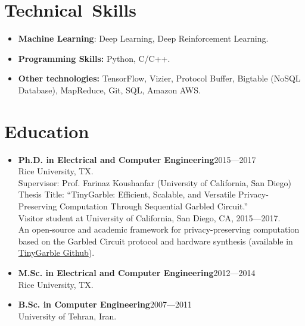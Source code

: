 \documentclass[overlapped]{res}
\begin{document}
\begin{resume}
\section{Technical\ Skills}
\begin{itemize}
\item {\bf Machine Learning}: Deep Learning, Deep Reinforcement Learning.
\item {\bf Programming Skills:} Python, C/C++.
\item {\bf Other technologies:}
TensorFlow, Vizier, Protocol Buffer, Bigtable (NoSQL Database), MapReduce, Git, SQL, Amazon AWS.
\end{itemize}

\section{Education}
\begin{itemize}
\item {\bf Ph.D. in Electrical and Computer Engineering}\hfill  2015---2017\\
Rice University, TX.\\
Supervisor: Prof. Farinaz Koushanfar (University of California, San Diego)\\
Thesis Title: ``TinyGarble: Efficient, Scalable, and Versatile Privacy-Preserving Computation Through Sequential Garbled Circuit.''\\
Visitor student at University of California, San Diego, CA, 2015---2017. \\
An open-source and academic framework for privacy-preserving computation based on the Garbled Circuit protocol and hardware synthesis (available in \href{https://github.com/esonghori/TinyGarble}{TinyGarble Github}).
\item {\bf M.Sc. in Electrical and Computer Engineering}\hfill 2012---2014\\
Rice University, TX.
\item {\bf B.Sc. in Computer Engineering}\hfill 2007---2011\\
University of Tehran, Iran.
\end{itemize}


\end{resume}
\end{document}
